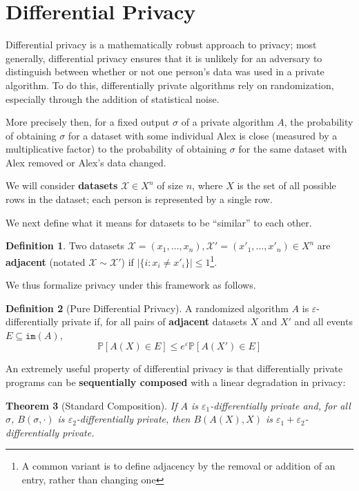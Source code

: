 \documentclass[12pt]{article}
\newcommand{\PP}{\mathbb{P}}
\newcommand{\im}{\texttt{im}}
\newtheorem{thm}{Theorem}[section]
\theoremstyle{definition}
\newtheorem{defn}[thm]{Definition}
\begin{document}
\section{Differential Privacy}

Differential privacy is a mathematically robust approach to privacy; most generally, differential privacy ensures that it is unlikely for an adversary to distinguish between whether or not one person's data was used in a private algorithm. To do this, differentially private algorithms rely on randomization, especially through the addition of statistical noise.

More precisely then, for a fixed output $\sigma$ of a private algorithm $A$, the probability of obtaining $\sigma$ for a dataset with some individual Alex is close (measured by a multiplicative factor) to the probability of obtaining $\sigma$ for the same dataset with Alex removed or Alex's data changed.

We will consider \textbf{datasets} $\mathcal{X}\in X^n$ of size $n$, where $X$ is the set of all possible rows in the dataset; each person is represented by a single row. 

We next define what it means for datasets to be ``similar'' to each other. 

\begin{defn}
    Two datasets $\mathcal{X}=(x_1, \ldots, x_n), \mathcal{X}'=(x'_1, \ldots, x'_n)\in X^n$ are \textbf{adjacent} (notated $\mathcal{X}\sim\mathcal{X}'$) if $|\{i: x_i\neq x'_i\}|\leq 1$\footnote{A common variant is to define adjacency by the removal or addition of an entry, rather than changing one}.
\end{defn}

We thus formalize privacy under this framework as follows.
\begin{defn}[Pure Differential Privacy]
    A randomized algorithm $A$ is $\varepsilon$-differentially private if, for all pairs of \textbf{adjacent} datasets $X$ and $X'$ and all events $E \subseteq \im(A)$, \[\PP[A(X) \in E]\leq e^\varepsilon \PP[A(X')\in E]\]
\end{defn}


An extremely useful property of differential privacy is that differentially private programs can be \textbf{sequentially composed} with a linear degradation in privacy:

\begin{thm}[Standard Composition]
    If $A$ is $\varepsilon_1$-differentially private and, for all $\sigma$, $B(\sigma, \cdot)$ is $\varepsilon_2$-differentially private, then $B(A(X), X)$ is $\varepsilon_1+\varepsilon_2$-differentially private. 
\end{thm}
\end{document}
